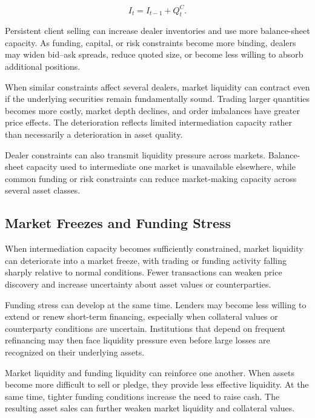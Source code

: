 \begin{equation}
I_t
=
I_{t-1}+Q_t^C.
\label{eq:ch21-dealer-inventory}
\end{equation}

Persistent client selling can increase dealer inventories and use more balance-sheet capacity. As funding, capital, or risk constraints become more binding, dealers may widen bid--ask spreads, reduce quoted size, or become less willing to absorb additional positions.

When similar constraints affect several dealers, market liquidity can contract even if the underlying securities remain fundamentally sound. Trading larger quantities becomes more costly, market depth declines, and order imbalances have greater price effects. The deterioration reflects limited intermediation capacity rather than necessarily a deterioration in asset quality.

Dealer constraints can also transmit liquidity pressure across markets. Balance-sheet capacity used to intermediate one market is unavailable elsewhere, while common funding or risk constraints can reduce market-making capacity across several asset classes.


\subsection{Market Freezes and Funding Stress}

When intermediation capacity becomes sufficiently constrained, market liquidity can deteriorate into a market freeze, with trading or funding activity falling sharply relative to normal conditions. Fewer transactions can weaken price discovery and increase uncertainty about asset values or counterparties.

Funding stress can develop at the same time. Lenders may become less willing to extend or renew short-term financing, especially when collateral values or counterparty conditions are uncertain. Institutions that depend on frequent refinancing may then face liquidity pressure even before large losses are recognized on their underlying assets.

\begin{tcolorbox}[
  enhanced,
  breakable,
  colback=white,
  colframe=FinanceBlue,
  boxrule=0.7pt,
  sharp corners,
  borderline west={2.2pt}{0pt}{FinanceBlue},
  title=\textbf{Financial Perspective: Market Liquidity and Funding Liquidity},
  coltitle=white,
  colbacktitle=FinanceBlue,
  fonttitle=\bfseries,
  before skip=1.2em,
  after skip=1.2em
]

Market liquidity and funding liquidity can reinforce one another. When assets become more difficult to sell or pledge, they provide less effective liquidity. At the same time, tighter funding conditions increase the need to raise cash. The resulting asset sales can further weaken market liquidity and collateral values.

\end{tcolorbox}

